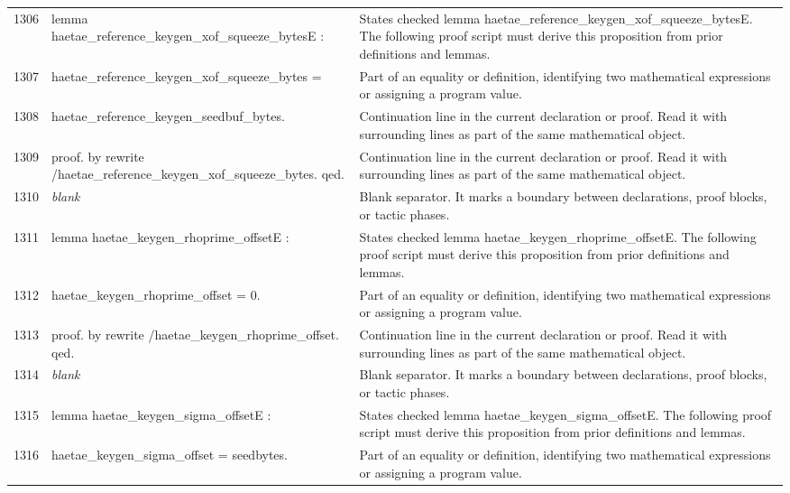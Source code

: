 \documentclass[10pt]{article}
\begin{document}
\begin{longtable}{r L{0.53\textwidth} L{0.37\textwidth}}
1306 & {\ttfamily\scriptsize lemma haetae\_reference\_keygen\_xof\_squeeze\_bytesE :} & States checked lemma haetae\_reference\_keygen\_xof\_squeeze\_bytesE.  The following proof script must derive this proposition from prior definitions and lemmas. \\
1307 & {\ttfamily\scriptsize   haetae\_reference\_keygen\_xof\_squeeze\_bytes =} & Part of an equality or definition, identifying two mathematical expressions or assigning a program value. \\
1308 & {\ttfamily\scriptsize   haetae\_reference\_keygen\_seedbuf\_bytes.} & Continuation line in the current declaration or proof.  Read it with surrounding lines as part of the same mathematical object. \\
1309 & {\ttfamily\scriptsize proof. by rewrite /haetae\_reference\_keygen\_xof\_squeeze\_bytes. qed.} & Continuation line in the current declaration or proof.  Read it with surrounding lines as part of the same mathematical object. \\
1310 & {\ttfamily\scriptsize \emph{blank}} & Blank separator.  It marks a boundary between declarations, proof blocks, or tactic phases. \\
1311 & {\ttfamily\scriptsize lemma haetae\_keygen\_rhoprime\_offsetE :} & States checked lemma haetae\_keygen\_rhoprime\_offsetE.  The following proof script must derive this proposition from prior definitions and lemmas. \\
1312 & {\ttfamily\scriptsize   haetae\_keygen\_rhoprime\_offset = 0.} & Part of an equality or definition, identifying two mathematical expressions or assigning a program value. \\
1313 & {\ttfamily\scriptsize proof. by rewrite /haetae\_keygen\_rhoprime\_offset. qed.} & Continuation line in the current declaration or proof.  Read it with surrounding lines as part of the same mathematical object. \\
1314 & {\ttfamily\scriptsize \emph{blank}} & Blank separator.  It marks a boundary between declarations, proof blocks, or tactic phases. \\
1315 & {\ttfamily\scriptsize lemma haetae\_keygen\_sigma\_offsetE :} & States checked lemma haetae\_keygen\_sigma\_offsetE.  The following proof script must derive this proposition from prior definitions and lemmas. \\
1316 & {\ttfamily\scriptsize   haetae\_keygen\_sigma\_offset = seedbytes.} & Part of an equality or definition, identifying two mathematical expressions or assigning a program value. \\

\end{longtable}
\end{document}
